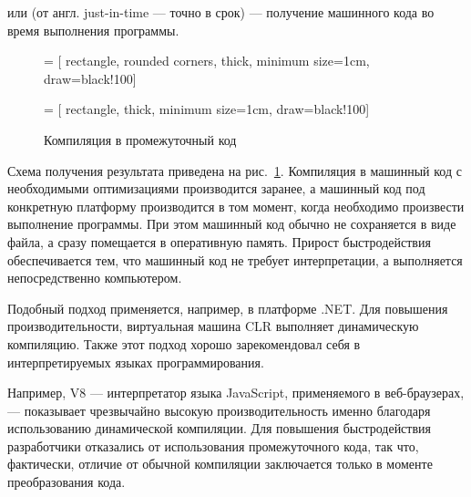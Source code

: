 \begin{defn}
   или
   (от англ. just-in-time — точно
  в срок) — получение машинного кода во время выполнения программы.
\end{defn}

\begin{figure}
  \begin{centering}
     = [
      rectangle,
      rounded corners,
      thick,
      minimum size=1cm,
      draw=black!100]
    
     = [
      rectangle,
      thick,
      minimum size=1cm,
      draw=black!100]
    
    \par
  \end{centering}

  \caption{Компиляция в промежуточный код\label{fig:jit}}
\end{figure}

Схема получения результата приведена на рис.~\ref{fig:jit}. Компиляция
в машинный код с необходимыми оптимизациями производится заранее, а
машинный код под конкретную платформу производится в том момент, когда
необходимо произвести выполнение программы. При этом машинный код
обычно не сохраняется в виде файла, а сразу помещается в оперативную
память. Прирост быстродействия обеспечивается тем, что машинный код не
требует интерпретации, а выполняется непосредственно компьютером.

Подобный подход применяется, например, в платформе .NET. Для повышения
производительности, виртуальная машина CLR выполняет динамическую
компиляцию. Также этот подход хорошо зарекомендовал себя в
интерпретируемых языках программирования.

Например, V8 — интерпретатор языка JavaScript, применяемого в
веб-браузерах, — показывает чрезвычайно высокую производительность
именно благодаря использованию динамической компиляции. Для повышения
быстродействия разработчики отказались от использования промежуточного
кода, так что, фактически, отличие от обычной компиляции заключается
только в моменте преобразования кода.

